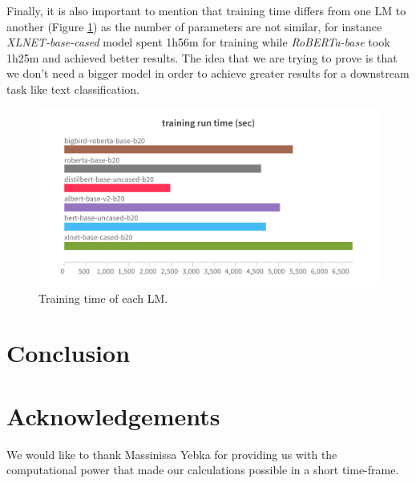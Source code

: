 \documentclass[conference]{IEEEtran}
\begin{document}
Finally, it is also important to mention that training time differs from one LM to another (Figure \ref{fig:train_time}) as the number of parameters are not similar, for instance \textit{XLNET-base-cased} model spent 1h56m for training while \textit{RoBERTa-base} took 1h25m and achieved better results. The idea that we are trying to prove is that we don't need a bigger model in order to achieve greater results for a downstream task like text classification.

\begin{figure}[htp]
    \centering
    \includegraphics[scale=0.13]{train_time.png}
    \caption[Comparison]{Training time of each LM.}
    \label{fig:train_time}
\end{figure}

\section{Conclusion}

\section{Acknowledgements}
We would like to thank Massinissa Yebka for providing us with the computational power that made our calculations possible in a short time-frame.





\end{document}
